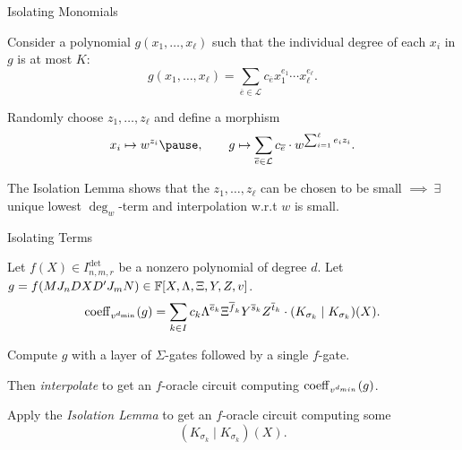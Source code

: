\documentclass[aspectratio=169]{beamer}
\begin{document}
\begin{frame}{Isolating Monomials}
    \begin{lem}[{\cite[Corollary 2.27]{DG25}}]
        Consider a polynomial $g(x_1, \ldots, x_\ell)$ such that the individual degree of each $x_i$ in $g$ is at most $K$:
        \[
            g(x_1, \ldots, x_\ell) = \sum_{\overline{e} \in \mathcal{L}} c_{\overline{e}} x_1^{e_1} \cdots x_{\ell}^{e_\ell}.
        \]

        \pause
        
        Randomly choose $z_1, \ldots, z_\ell$ and define a morphism
        \[
            x_i \mapsto w^{z_i} \pause, \qquad g \mapsto \sum_{\overline{e} \in \mathcal{L}} c_{\overline{e}} \cdot w^{\sum_{i = 1}^\ell e_i z_i}.
        \]

        \pause

        The Isolation Lemma shows that the $z_1, \ldots, z_\ell$ can be chosen to be small \pause $\implies\ \exists$ unique lowest $\deg_w$-term \pause and interpolation w.r.t $w$ is small.
    \end{lem}
\end{frame}

\begin{frame}{Isolating Terms}
  \begin{lem}
    Let $f(X) \in I^{\det}_{n, m, r}$ be a nonzero polynomial of degree $d$.
    Let $g = f(M J_n D X D' J_m N) \in \mathbb{F}[X, \Lambda, \Xi, Y, Z, v]$.
    \[
      \operatorname{coeff}_{v^{d_{\min}}}(g)= \sum_{k\in I} c_k \Lambda^{\overline{e}_k}\Xi^{\overline{f}_k}Y^{\overline{s}_k}Z^{\overline{t}_k}\cdot (K_{\sigma_k}\mid K_{\sigma_k})(X).
    \]
  \end{lem}

  \pause
  \vspace{-10pt}

  Compute $g$ with a layer of $\Sigma$-gates followed by a single $f$-gate.

  \pause
  \vspace{10pt}

  Then \emph{interpolate} to get an $f$-oracle circuit computing $\operatorname{coeff}_{v^{d_{min}}}(g)$.

  \pause
  \vspace{10pt}

  Apply the \emph{Isolation Lemma} to get an $f$-oracle circuit computing some
  \[
    (K_{\sigma_k} \mid K_{\sigma_k})(X).
  \]
\end{frame}

\end{document}
